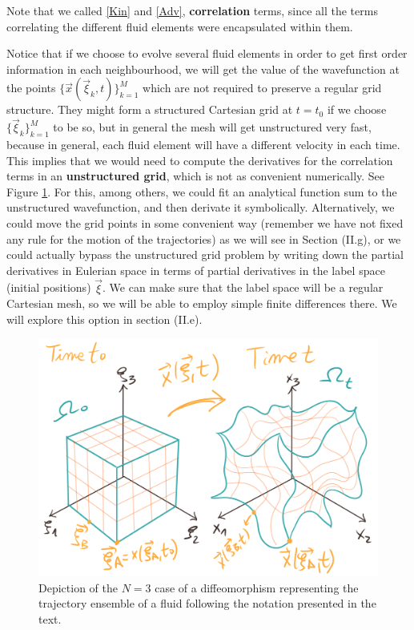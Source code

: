 \documentclass[11pt, a4paper]{article} %
\begin{document}
Note that we called \eqref{Kin} and \eqref{Adv}, {\bf correlation} terms, since all the terms correlating the different fluid elements were encapsulated within them.

Notice that if we choose to evolve several fluid elements in order to get first order information in each neighbourhood, we will get the value of the wavefunction at the points $\{\vec{x}(\vec{\xi}_k,t)\}_{k=1}^M$ which are not required to preserve a regular grid structure. They might form a structured Cartesian grid at $t=t_0$ if we choose $\{\vec{\xi}_k\}_{k=1}^M$ to be so, but in general the mesh will get unstructured very fast, because in general, each fluid element will have a different velocity in each time. This implies that we would need to compute the derivatives for the correlation terms in an {\bf unstructured grid}, which is not as convenient numerically. See Figure \ref{fig:unstructure_fluid}. For this, among others, we could fit an analytical function sum to the unstructured wavefunction, and then derivate it symbolically. Alternatively, we could move the grid points in some convenient way (remember we have not fixed any rule for the motion of the trajectories) as we will see in Section (II.g), or we could actually bypass the unstructured grid problem by writing down the partial derivatives in Eulerian space in terms of partial derivatives in the label space (initial positions) $\vec{\xi}$. We can make sure that the label space will be a regular Cartesian mesh, so we will be able to employ simple finite differences there. We will explore this option in section (II.e). 
\begin{figure}[h!]
  \centering
    \includegraphics[width=0.65\linewidth]{1deforma.png}
  \caption{Depiction of the $N=3$ case of a diffeomorphism representing the trajectory ensemble of a fluid following the notation presented in the text. }
  \label{fig:unstructure_fluid}
\end{figure}
\end{document}
